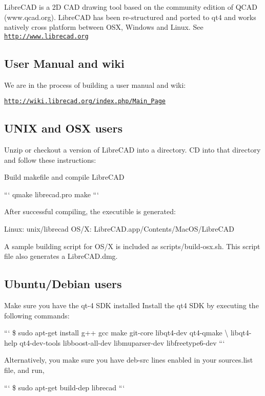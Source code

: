 Libre\-C\-A\-D is a 2\-D C\-A\-D drawing tool based on the community edition of Q\-C\-A\-D (www.\-qcad.\-org). Libre\-C\-A\-D has been re-\/structured and ported to qt4 and works natively cross platform between O\-S\-X, Windows and Linux. See \href{http://www.librecad.org}{\tt http\-://www.\-librecad.\-org}

\subsection*{User Manual and wiki}

We are in the process of building a user manual and wiki\-:

\href{http://wiki.librecad.org/index.php/Main_Page}{\tt http\-://wiki.\-librecad.\-org/index.\-php/\-Main\-\_\-\-Page}

\subsection*{U\-N\-I\-X and O\-S\-X users}

Unzip or checkout a version of Libre\-C\-A\-D into a directory. C\-D into that directory and follow these instructions\-:

Build makefile and compile Libre\-C\-A\-D

``` qmake librecad.\-pro make ```

After successful compiling, the executible is generated\-:

Linux\-: unix/librecad O\-S/\-X\-: Libre\-C\-A\-D.\-app/\-Contents/\-Mac\-O\-S/\-Libre\-C\-A\-D

A sample building script for O\-S/\-X is included as scripts/build-\/osx.\-sh. This script file also generates a Libre\-C\-A\-D.\-dmg.

\subsection*{Ubuntu/\-Debian users}

Make sure you have the qt-\/4 S\-D\-K installed Install the qt4 S\-D\-K by executing the following commands\-:

``` \$ sudo apt-\/get install g++ gcc make git-\/core libqt4-\/dev qt4-\/qmake \textbackslash{} libqt4-\/help qt4-\/dev-\/tools libboost-\/all-\/dev libmuparser-\/dev libfreetype6-\/dev ```

Alternatively, you make sure you have deb-\/src lines enabled in your sources.\-list file, and run,

``` \$ sudo apt-\/get build-\/dep librecad ```

